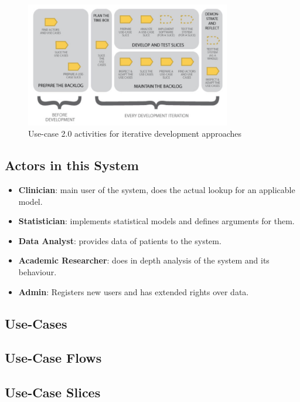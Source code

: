 {\begin{figure}[!ht]
\centering
\includegraphics[width=0.8\textwidth]{figures/uc20_flow}
\caption{Use-case 2.0 activities for iterative development approaches}
\label{fig:usecase20:flow}
\end{figure}


\subsection{Actors in this System}
\label{sub:sassoon:actors}
\begin{itemize}
	\item \textbf{Clinician}: main user of the system, does the actual lookup for an applicable model.
	\item \textbf{Statistician}: implements statistical models and defines arguments for them.
	\item \textbf{Data Analyst}: provides data of patients to the system.
	\item \textbf{Academic Researcher}: does in depth analysis of the system and its behaviour.
	\item \textbf{Admin}: Registers new users and has extended rights over data.
\end{itemize}
}

\subsection{Use-Cases}

\subsection{Use-Case Flows}

\subsection{Use-Case Slices}